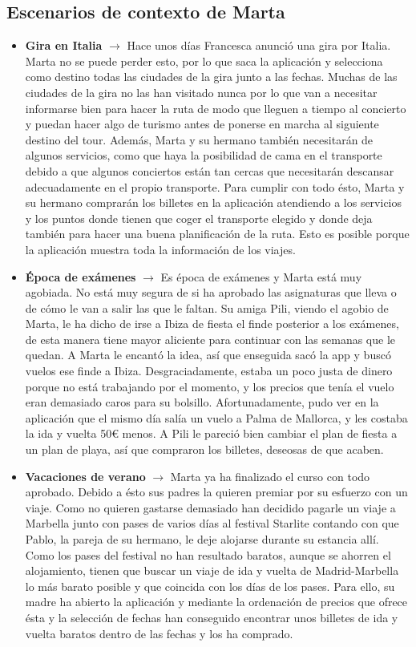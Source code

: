\subsection{Escenarios de contexto de Marta}
\begin{itemize}
    \item \textbf{Gira en Italia} $\rightarrow$ Hace unos días Francesca anunció una gira por Italia. Marta no se puede perder esto, por lo que saca la 
    aplicación y selecciona como destino todas las ciudades de la gira junto a las fechas. Muchas de las ciudades de la gira no las han visitado nunca 
    por lo que van a necesitar informarse bien para hacer la ruta de modo que lleguen a tiempo al concierto y puedan hacer algo de turismo antes de 
    ponerse en marcha al siguiente destino del tour. Además, Marta y su hermano también necesitarán de algunos servicios, como que haya la posibilidad 
    de cama en el transporte debido a que algunos conciertos están tan cercas que necesitarán descansar adecuadamente en el propio transporte. 
    Para cumplir con todo ésto, Marta y su hermano comprarán los billetes en la aplicación atendiendo a los servicios y los puntos donde tienen que 
    coger el transporte elegido y donde deja también para hacer una buena planificación de la ruta. Esto es posible porque la aplicación muestra toda 
    la información de los viajes.
    \item \textbf{Época de exámenes} $\rightarrow$ Es época de exámenes y Marta está muy agobiada. No está muy segura de si ha aprobado las asignaturas 
    que lleva o de cómo le van a salir las que le faltan. Su amiga Pili, viendo el agobio de Marta, le ha dicho de irse a Ibiza de fiesta el finde posterior 
    a los exámenes, de esta manera tiene mayor aliciente para continuar con las semanas que le quedan. A Marta le encantó la idea, así que enseguida sacó 
    la app y buscó vuelos ese finde a Ibiza. Desgraciadamente, estaba un poco justa de dinero porque no está trabajando por el momento, y los precios 
    que tenía el vuelo eran demasiado caros para su bolsillo. Afortunadamente, pudo ver en la aplicación que el mismo día salía un vuelo a Palma de Mallorca, 
    y les costaba la ida y vuelta 50€ menos. A Pili le pareció bien cambiar el plan de fiesta a un plan de playa, así que compraron los billetes, deseosas 
    de que acaben.
    \item \textbf{Vacaciones de verano} $\rightarrow$ Marta ya ha finalizado el curso con todo aprobado. Debido a ésto sus padres la quieren premiar por su 
    esfuerzo con un viaje. Como no quieren gastarse demasiado han decidido pagarle un viaje a Marbella junto con pases de varios días al festival Starlite 
    contando con que Pablo, la pareja de su hermano, le deje alojarse durante su estancia allí. Como los pases del festival no han resultado baratos, aunque 
    se ahorren el alojamiento, tienen que buscar un viaje de ida y vuelta de Madrid-Marbella lo más barato posible y que coincida con los días de los pases. 
    Para ello, su madre ha abierto la aplicación y mediante la ordenación de precios que ofrece ésta y la selección de fechas han conseguido encontrar unos 
    billetes de ida y vuelta baratos dentro de las fechas y los ha comprado.
\end{itemize}
